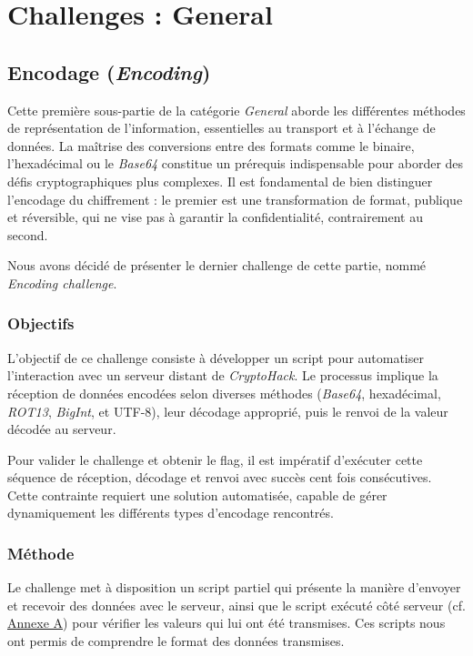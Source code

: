 \section{Challenges : General}


\subsection{Encodage (\textit{Encoding})}

Cette première sous-partie de la catégorie \textit{General} aborde les différentes
méthodes de représentation de l'information, essentielles au transport
et à l'échange de données. La maîtrise des conversions entre des formats
comme le binaire, l'hexadécimal ou le \textit{Base64} constitue un prérequis
indispensable pour aborder des défis cryptographiques plus complexes. Il
est fondamental de bien distinguer l'encodage du chiffrement : le premier
est une transformation de format, publique et réversible, qui ne vise pas
à garantir la confidentialité, contrairement au second.

Nous avons décidé de présenter le dernier challenge de cette partie,
nommé \textit{Encoding challenge}.

\subsubsection{Objectifs}
L'objectif de ce challenge consiste à développer un script pour
automatiser l'interaction avec un serveur distant de \textit{CryptoHack}. Le
processus implique la réception de données encodées selon diverses
méthodes (\textit{Base64}, hexadécimal, \textit{ROT13}, \textit{BigInt}, et UTF-8), leur décodage
approprié, puis le renvoi de la valeur décodée au serveur.

Pour valider le challenge et obtenir le flag, il est impératif d'exécuter
cette séquence de réception, décodage et renvoi avec succès cent fois
consécutives. Cette contrainte requiert une solution
automatisée, capable de gérer dynamiquement les différents types
d'encodage rencontrés.

\subsubsection{Méthode}
Le challenge met à disposition un script partiel qui présente la manière
d'envoyer et recevoir des données avec le serveur, ainsi que le script
exécuté côté serveur (cf. \hyperref[annexe:script-server-encoding]{Annexe A}) pour vérifier les valeurs qui lui ont été
transmises. Ces scripts nous ont permis de comprendre le format des
données transmises.

